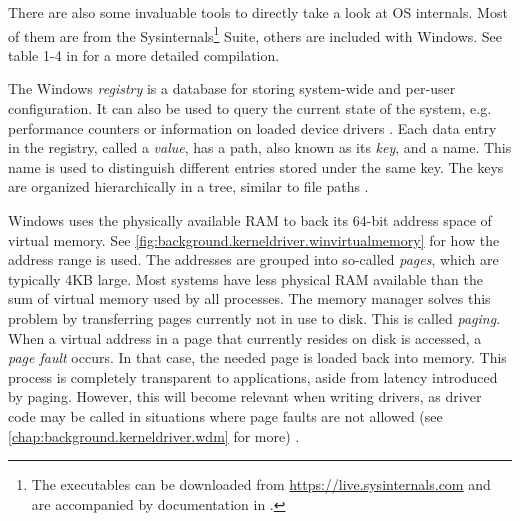 There are also some invaluable tools to directly take a look at OS internals. Most of them are from the Sysinternals\footnote{\label{fn:background.kerneldriver.sysinternals} The executables can be downloaded from \url{https://live.sysinternals.com} and are accompanied by documentation in \cite{Russinovich2016}.} Suite, others are included with Windows. See table 1-4 in \cite{Yosifovich2017} for a more detailed compilation.

The Windows \emph{registry} is a database for storing system-wide and per-user configuration. It can also be used to query the current state of the system, e.g. performance counters or information on loaded device drivers \cite{Yosifovich2017}. Each data entry in the registry, called a \emph{value}, has a path, also known as its \emph{key}, and a name. This name is used to distinguish different entries stored under the same key. The keys are organized hierarchically in a tree, similar to file paths \cite{Registry2018}.

Windows uses the physically available RAM to back its 64-bit address space of virtual memory. See \autoref{fig:background.kerneldriver.winvirtualmemory} for how the address range is used. The addresses are grouped into so-called \emph{pages}, which are typically 4KB large. Most systems have less physical RAM available than the sum of virtual memory used by all processes. The memory manager solves this problem by transferring pages currently not in use to disk. This is called \emph{paging}. When a virtual address in a page that currently resides on disk is accessed, a \emph{page fault} occurs. In that case, the needed page is loaded back into memory. This process is completely transparent to applications, aside from latency introduced by paging. However, this will become relevant when writing drivers, as driver code may be called in situations where page faults are not allowed (see \autoref{chap:background.kerneldriver.wdm} for more) \cite{Yosifovich2017}.


